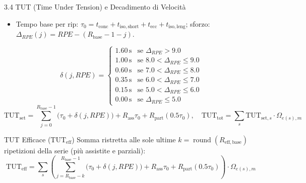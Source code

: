 \documentclass[aspectratio=169, 10pt]{beamer}
\begin{document}
\begin{frame}{3.4 TUT (Time Under Tension) e Decadimento di Velocità}
    \footnotesize
    \begin{itemize}
        \item Tempo base per rip: $\tau_0 = t_{\mathrm{conc}} + t_{\mathrm{iso,short}} + t_{\mathrm{ecc}} + t_{\mathrm{iso,leng}}$; sforzo: $\Delta_{RPE}(j) = RPE - (R_{\mathrm{base}} - 1 - j)$.
    \end{itemize}
    \vspace{-0.15cm}
    \begin{equation*}
    \delta(j, RPE) = \begin{cases} 
    1.60\,\text{s} & \text{se } \Delta_{RPE} > 9.0 \\
    1.00\,\text{s} & \text{se } 8.0 < \Delta_{RPE} \le 9.0 \\
    0.60\,\text{s} & \text{se } 7.0 < \Delta_{RPE} \le 8.0 \\
    0.35\,\text{s} & \text{se } 6.0 < \Delta_{RPE} \le 7.0 \\
    0.15\,\text{s} & \text{se } 5.0 < \Delta_{RPE} \le 6.0 \\
    0.00\,\text{s} & \text{se } \Delta_{RPE} \le 5.0 
    \end{cases}
    \end{equation*}
    \vspace{-0.2cm}
    $$\text{TUT}_{\mathrm{set}} = \sum_{j=0}^{R_{\mathrm{base}}-1} \big(\tau_0 + \delta(j, RPE)\big) + R_{\mathrm{ass}}\tau_0 + R_{\mathrm{part}}(0.5\tau_0), \quad \text{TUT}_{\mathrm{tot}} = \sum_{s} \text{TUT}_{\mathrm{set}, s} \cdot \Omega_{e(s), m}$$
    \begin{block}{TUT Efficace ($\text{TUT}_{\mathrm{eff}}$)}
        \footnotesize
        Somma ristretta alle sole ultime $k = \operatorname{round}(R_{\mathrm{eff,base}})$ ripetizioni della serie (più assistite e parziali):
        $$\text{TUT}_{\mathrm{eff}} = \sum_s \left( \sum_{j=R_{\mathrm{base}}-k}^{R_{\mathrm{base}}-1} \big(\tau_0 + \delta(j, RPE)\big) + R_{\mathrm{ass}}\tau_0 + R_{\mathrm{part}}(0.5\tau_0) \right) \cdot \Omega_{e(s), m}$$
    \end{block}
\end{frame}
\end{document}
